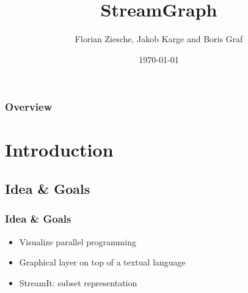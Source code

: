 \documentclass{beamer}
\title[StreamGraph]{StreamGraph} %
\author{Florian Ziesche, Jakob Karge and Boris Graf} %
\institute[TUB] %
{
Technische Universit\"at Berlin\\ %
}
\date{\today} %
\begin{document}
\begin{frame}
\titlepage %
\end{frame}

\begin{frame}
\frametitle{Overview} %
\tableofcontents %
\end{frame}


\section{Introduction} %
\subsection{Idea \& Goals}
\begin{frame}
\frametitle{Idea \& Goals}
\begin{itemize}
	\item Visualize parallel programming
	\item Graphical layer on top of a textual language
\end{itemize}
\begin{itemize}
	\item StreamIt: subset representation
\end{itemize}
\end{frame}
\end{document}
